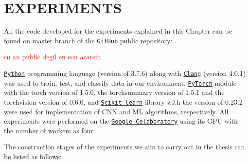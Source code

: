 \chapter{EXPERIMENTS}
\label{ch:CH5}

All the code developed for the experiments explained in this Chapter can be found on master branch of the \verb|GitHub| public repository: \newline
\textcolor{blue}{}.

\textcolor{red}{su an public degil en son acarsin}

\href{https://www.python.org/downloads/release/python-376/}{\texttt{Python}} programming language (version of 3.7.6) along with \href{https://releases.llvm.org/4.0.1/}{\texttt{Clang}} (version 4.0.1) was used to train, test, and classify data in our environment. \href{https://pytorch.org/get-started/previous-versions/#v150}{\texttt{PyTorch}} module with the torch version of 1.5.0, the torchsummary version of 1.5.1 and the torchvision version of 0.6.0, and \href{https://scikit-learn.org/stable/whats_new/v0.23.html}{\texttt{Scikit-learn}} library with the version of 0.23.2 were used for implementation of CNN and ML algorithms, respectively. All experiments were performed on the \href{https://colab.research.google.com/}{\texttt{Google Colaboratory}} using its GPU with the number of workers as four.

The construction stages of the experiments we aim to carry out in the thesis can be listed as follows:

